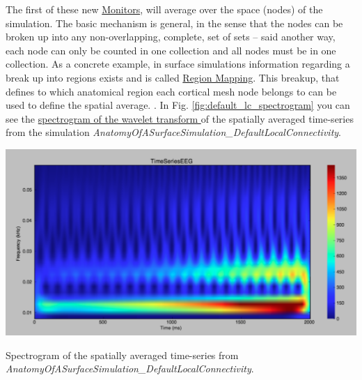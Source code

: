 \documentclass{tufte-handout}
\begin{document}
The first of these new \underline{Monitors},  will average over the
space (nodes) of the simulation.  The basic
mechanism is general, in the sense that the nodes can be broken up into any
non-overlapping, complete, set of sets -- said another way, each node can only
be counted in one collection and all nodes must be in one collection. As a
concrete example, in surface simulations information regarding a break up
into regions exists and is called \underline{Region Mapping}.  This breakup, that defines to which anatomical region each cortical mesh node belongs to can be used to define the spatial average. . In Fig. \ref{fig:default_lc_spectrogram} you can see the \underline{spectrogram of the wavelet transform } of the spatially averaged time-series from 
the simulation \textit{AnatomyOfASurfaceSimulation\_DefaultLocalConnectivity}. 

\begin{marginfigure}
 \includegraphics[width=\linewidth]{Handout_UI_BuildingYourOwnBrainNetworkModel_DefaultLocalConnectivityWaveletSpectrogram.png}%
  \caption{Spectrogram of the spatially averaged time-series from \textit{AnatomyOfASurfaceSimulation\_DefaultLocalConnectivity}.}%
  \label{fig:default_lc_spectrogram}%
\end{marginfigure}


\end{document}

